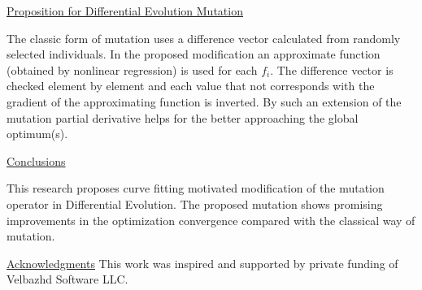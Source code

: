 \documentclass{article}
\begin{document}
\vspace*{3mm}
\underline{Proposition for Differential Evolution Mutation} 

\vspace*{2mm}
The classic form of mutation uses a difference vector calculated from randomly selected individuals. In the proposed modification an approximate function (obtained by nonlinear regression) is used for each $f_i$. The difference vector is checked element by element and each value that not corresponds with the gradient of the approximating function is inverted. By such an extension of the mutation partial derivative helps for the better approaching the global optimum(s). 

\vspace*{3mm}
\underline{Conclusions} 

\vspace*{2mm}
This research proposes curve fitting motivated modification of the mutation operator in Differential Evolution. The proposed mutation shows promising improvements in the optimization convergence compared with the classical way of mutation. 

\vspace*{5mm}
\underline{Acknowledgments}
This work was inspired and supported by private funding of Velbazhd Software LLC.
\end{document}
